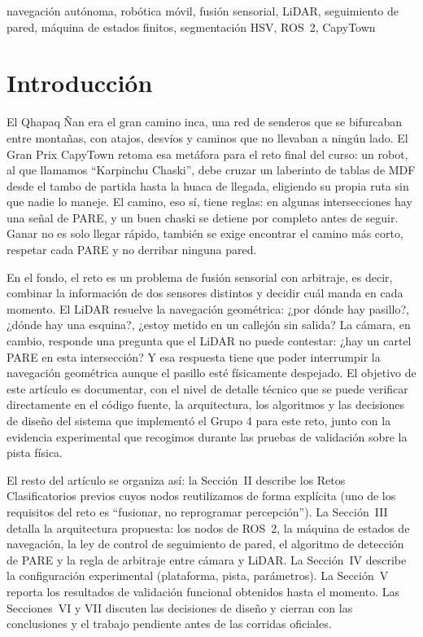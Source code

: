 \documentclass[conference]{IEEEtran}
\begin{document}
\begin{IEEEkeywords}
navegación autónoma, robótica móvil, fusión sensorial, LiDAR, seguimiento de pared, máquina de estados finitos, segmentación HSV, ROS~2, CapyTown
\end{IEEEkeywords}

\section{Introducción}

El Qhapaq Ñan era el gran camino inca, una red de senderos que se bifurcaban entre montañas, con atajos, desvíos y caminos que no llevaban a ningún lado. El Gran Prix CapyTown retoma esa metáfora para el reto final del curso: un robot, al que llamamos ``Karpinchu Chaski'', debe cruzar un laberinto de tablas de MDF desde el tambo de partida hasta la huaca de llegada, eligiendo su propia ruta sin que nadie lo maneje. El camino, eso sí, tiene reglas: en algunas intersecciones hay una señal de PARE, y un buen chaski se detiene por completo antes de seguir. Ganar no es solo llegar rápido, también se exige encontrar el camino más corto, respetar cada PARE y no derribar ninguna pared.

En el fondo, el reto es un problema de fusión sensorial con arbitraje, es decir, combinar la información de dos sensores distintos y decidir cuál manda en cada momento. El LiDAR resuelve la navegación geométrica: ¿por dónde hay pasillo?, ¿dónde hay una esquina?, ¿estoy metido en un callejón sin salida? La cámara, en cambio, responde una pregunta que el LiDAR no puede contestar: ¿hay un cartel PARE en esta intersección? Y esa respuesta tiene que poder interrumpir la navegación geométrica aunque el pasillo esté físicamente despejado. El objetivo de este artículo es documentar, con el nivel de detalle técnico que se puede verificar directamente en el código fuente, la arquitectura, los algoritmos y las decisiones de diseño del sistema que implementó el Grupo 4 para este reto, junto con la evidencia experimental que recogimos durante las pruebas de validación sobre la pista física.

El resto del artículo se organiza así: la Sección~II describe los Retos Clasificatorios previos cuyos nodos reutilizamos de forma explícita (uno de los requisitos del reto es ``fusionar, no reprogramar percepción''). La Sección~III detalla la arquitectura propuesta: los nodos de ROS~2, la máquina de estados de navegación, la ley de control de seguimiento de pared, el algoritmo de detección de PARE y la regla de arbitraje entre cámara y LiDAR. La Sección~IV describe la configuración experimental (plataforma, pista, parámetros). La Sección~V reporta los resultados de validación funcional obtenidos hasta el momento. Las Secciones~VI y VII discuten las decisiones de diseño y cierran con las conclusiones y el trabajo pendiente antes de las corridas oficiales.
\end{document}
